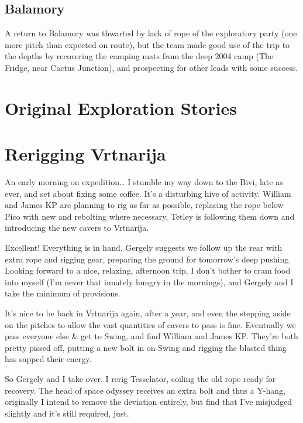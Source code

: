 \subsection{Balamory}\label{balamory}

A return to Balamory was thwarted by lack of rope of the exploratory
party (one more pitch than expected on route), but the team made good
use of the trip to the depths by recovering the camping mats from the
deep 2004 camp (The Fridge, near Cactus Junction), and prospecting for
other leads with some success.

\section{Original Exploration
Stories}\label{original-exploration-stories}

\section{Rerigging Vrtnarija}\label{rerigging-vrtnarija}

An early morning on expedition\ldots{} I stumble my way down to the
Bivi, late as ever, and set about fixing some coffee. It's a disturbing
hive of activity. William and James KP are planning to rig as far as
possible, replacing the rope below Pico with new and rebolting where
necessary, Tetley is following them down and introducing the new cavers
to Vrtnarija.

Excellent! Everything is in hand. Gergely suggests we follow up the rear
with extra rope and rigging gear, preparing the ground for tomorrow's
deep pushing. Looking forward to a nice, relaxing, afternoon trip, I
don't bother to cram food into myself (I'm never that innately hungry in
the mornings), and Gergely and I take the minimum of provisions.

It's nice to be back in Vrtnarija again, after a year, and even the
stepping aside on the pitches to allow the vast quantities of cavers to
pass is fine. Eventually we pass everyone else \& get to Swing, and find
William and James KP. They're both pretty pissed off, putting a new bolt
in on Swing and rigging the blasted thing has sapped their energy.

So Gergely and I take over. I rerig Tesselator, coiling the old rope
ready for recovery. The head of space odyssey receives an extra bolt and
thus a Y-hang, originally I intend to remove the deviation entirely, but
find that I've misjudged slightly and it's still required, just.


